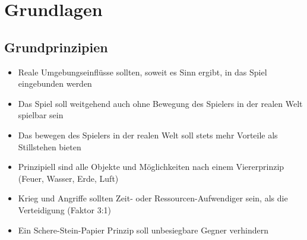\chapter{Grundlagen}
\label{Grundlagen}

\section{Grundprinzipien}
\begin{itemize}
\item Reale Umgebungseinflüsse sollten, soweit es Sinn ergibt, in das Spiel eingebunden werden
\item Das Spiel soll weitgehend auch ohne Bewegung des Spielers in der realen Welt spielbar sein
\item Das bewegen des Spielers in der realen Welt soll stets mehr Vorteile als Stillstehen bieten
\item Prinzipiell sind alle Objekte und Möglichkeiten nach einem Viererprinzip (Feuer, Wasser, Erde, Luft)
\item Krieg und Angriffe sollten Zeit- oder Ressourcen-Aufwendiger sein, als die Verteidigung (Faktor 3:1)
\item Ein Schere-Stein-Papier Prinzip soll unbesiegbare Gegner verhindern

\end{itemize}